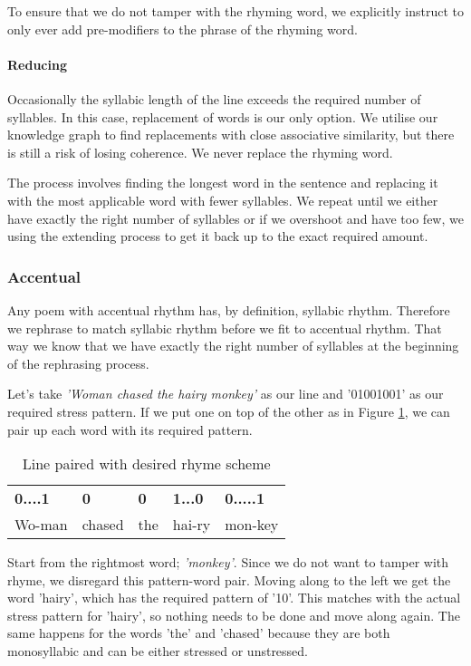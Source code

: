 To ensure that we do not tamper with the rhyming word, we explicitly instruct to only ever add pre-modifiers to the phrase of the rhyming word.

\paragraph{Reducing}
Occasionally the syllabic length of the line exceeds the required number of syllables. In this case, replacement of words is our only option. We utilise our knowledge graph to find replacements  with close associative similarity, but there is still a risk of losing coherence. We never replace the rhyming word.

The process involves finding the longest word in the sentence and replacing it with the most applicable word with fewer syllables. We repeat until we either have exactly the right number of syllables or if we overshoot and have too few, we using the extending process to get it back up to the exact required amount.

\subsubsection{Accentual}
Any poem with accentual rhythm has, by definition, syllabic rhythm. Therefore we rephrase to match syllabic rhythm before we fit to accentual rhythm. That way we know that we have exactly the right number of syllables at the beginning of the rephrasing process.

Let's take \textit{'Woman chased the hairy monkey'} as our line and '01001001' as our required stress pattern. If we put one on top of the other as in Figure \ref{tab:rs-pair}, we can pair up each word with its required pattern.

\begin{table}
\centering
    \begin{tabular}{lllll}
    \textbf{0....1}      & \textbf{0}        & \textbf{0}  & \textbf{1...0}   & \textbf{0.....1}     \\
    Wo-man & chased & the & hai-ry & mon-key \\
    \end{tabular}
\caption{Line paired with desired rhyme scheme}
\label{tab:rs-pair}
\end{table}

Start from the rightmost word; \textit{'monkey'}. Since we do not want to tamper with rhyme, we disregard this pattern-word pair. Moving along to the left we get the word 'hairy', which has the required pattern of '10'. This matches with the actual stress pattern for 'hairy', so nothing needs to be done and move along again. The same happens for the words 'the' and 'chased' because they are both monosyllabic and can be either stressed or unstressed.

